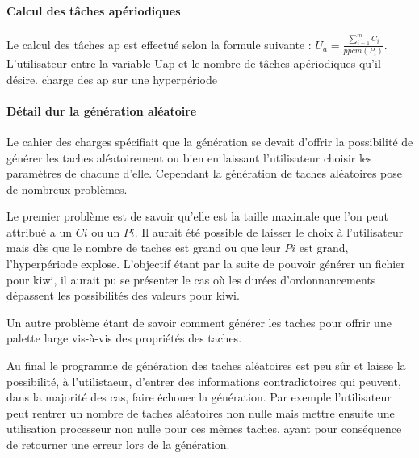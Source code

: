 \paragraph{Calcul des tâches apériodiques} 
Le calcul des tâches ap est effectué selon la formule suivante : $ U_a =  \frac{\sum_{i=1}^m C_i}{ppcm(P_i)}$. L'utilisateur entre la variable Uap  et le nombre de tâches apériodiques qu'il désire. 
charge des ap sur une hyperpériode 

\paragraph{Détail dur la génération aléatoire}
Le cahier des charges spécifiait que la génération se devait d'offrir la possibilité de générer les taches aléatoirement ou bien en laissant l'utilisateur choisir les paramètres de chacune d'elle. Cependant la génération de taches aléatoires pose de nombreux problèmes.

Le premier problème est de savoir qu'elle est la taille maximale que l'on peut attribué a un $Ci$ ou un $Pi$. Il aurait été possible de laisser le choix à l'utilisateur mais dès que le nombre de taches est grand ou que leur $Pi$ est grand, l'hyperpériode explose. L'objectif étant par la suite de pouvoir générer un fichier pour kiwi, il aurait pu se présenter le cas où les durées d'ordonnancements dépassent les possibilités des valeurs pour kiwi.

Un autre problème étant de savoir comment générer les taches pour offrir une palette large vis-à-vis des propriétés des taches.

Au final le programme de génération des taches aléatoires est peu sûr et laisse la possibilité, à l'utilistaeur, d'entrer des informations contradictoires qui peuvent, dans la majorité des cas, faire échouer la génération.
Par exemple l'utilisateur peut rentrer un nombre de taches aléatoires non nulle mais mettre ensuite une utilisation processeur non nulle pour ces mêmes taches, ayant pour conséquence de retourner une erreur lors de la génération.

